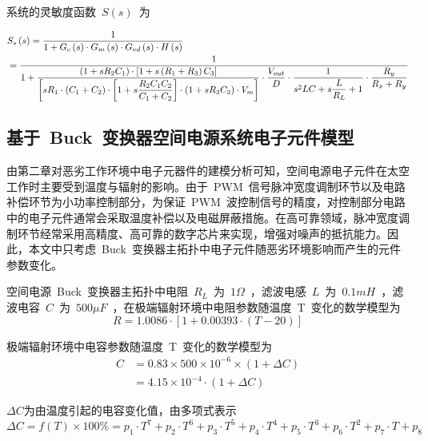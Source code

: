 系统的灵敏度函数~$S\left(s\right)$~为
\begin{small}
\begin{equation}\label{equ:chap5:Index6}
\begin{split}
 &  S_s\left(s\right) =\displaystyle\frac{1}{1+{G_c\left(s\right)}\cdot{G_m\left(s\right)}\cdot{G_{vd}\left(s\right)}\cdot{H\left(s\right)}}\\
     &=\displaystyle\frac{1}{1+\displaystyle\frac{\left(1+sR_2C_1\right)\cdot\left[1+s\left(R_1+R_3\right)C_3\right]}{\left[{sR_1}\cdot\left(C_1+C_2\right)\cdot\left[1+s\displaystyle\frac{R_2C_1C_2}{C_1+C_2}\right]\cdot\left(1+sR_3C_3\right)\cdot{V_m}\right]}\cdot\displaystyle\frac{V_{out}}{D}\cdot\displaystyle\frac{1}{s^2LC+{s}\displaystyle\frac{L}{R_L}+1}\cdot\displaystyle\frac{R_y}{R_x+R_y}}
\end{split}
\end{equation}
\end{small}

\subsection{基于~Buck~变换器空间电源系统电子元件模型}
\label{sub:chap5:step}
由第二章对恶劣工作环境中电子元器件的建模分析可知，空间电源电子元件在太空工作时主要受到温度与辐射的影响。由于~PWM~信号脉冲宽度调制环节以及电路补偿环节为小功率控制部分，为保证~PWM~波控制信号的精度，对控制部分电路中的电子元件通常会采取温度补偿以及电磁屏蔽措施。在高可靠领域，脉冲宽度调制环节经常采用高精度、高可靠的数字芯片来实现，增强对噪声的抵抗能力。因此，本文中只考虑~Buck~变换器主拓扑中电子元件随恶劣环境影响而产生的元件参数变化。

空间电源~Buck~变换器主拓扑中电阻~$R_L$~为~$1\Omega$~，滤波电感~$L$~为~$0.1mH$~，滤波电容~$C$~为~$500\mu F$~，在极端辐射环境中电阻参数随温度~T~变化的数学模型为
\begin{equation}\label{equ:chap5:Index7}
  R=1.0086\cdot\left[1+0.00393\cdot\left(T-20\right)\right]
\end{equation}

极端辐射环境中电容参数随温度~T~变化的数学模型为
\begin{equation}\label{equ:chap5:Index8}
\begin{split}
   C & =0.83\times500\times10^{-6}\times\left(1+\Delta C\right) \\
      & =4.15\times10^{-4}\cdot\left(1+\Delta C\right)
\end{split}
\end{equation}

$\Delta C$为由温度引起的电容变化值，由多项式表示
\begin{equation}\label{equ:chap5:Index9}
  \Delta C=f\left(T\right)\times 100\%=p_1\cdot T^7+p_2\cdot T^6+p_3\cdot T^5+p_4\cdot T^4+p_5\cdot T^3+p_6\cdot T^2+p_7\cdot T+p_8
\end{equation}	

